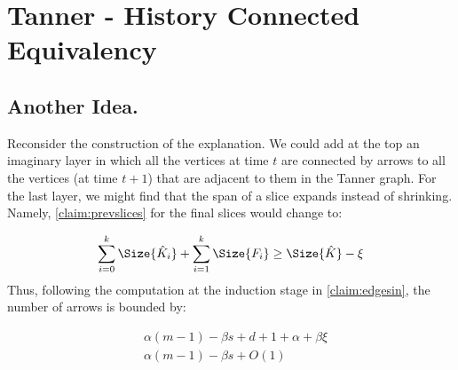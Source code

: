 
\section{Tanner - History Connected Equivalency}

\subsection{Another Idea.}
Reconsider the construction of the explanation. We could add at the top an imaginary layer in which all the vertices at time $t$ are connected by arrows to all the vertices (at time $t+1$) that are adjacent to them in the Tanner graph. For the last layer, we might find that the span of a slice expands instead of shrinking. Namely, \cref{claim:prevslices} for the final slices would change to:

\begin{equation*}
  \begin{split}
\sum_{i=0}^{k}\Size{\hat{K}_{i}} +  \sum^{k}_{i=1}\Size{F_{i}} \ge \Size{\hat{K}} - \xi 
  \end{split}
\end{equation*}
Thus, following the computation at the induction stage in \cref{claim:edgesin}, the number of arrows is bounded by:

\begin{equation*}
  \begin{split}
    & \alpha \left(m - 1\right) - \beta s + d+1+ \alpha + \beta \xi \\
    & \alpha \left(m - 1\right) - \beta s + O(1) 
  \end{split}
\end{equation*}

